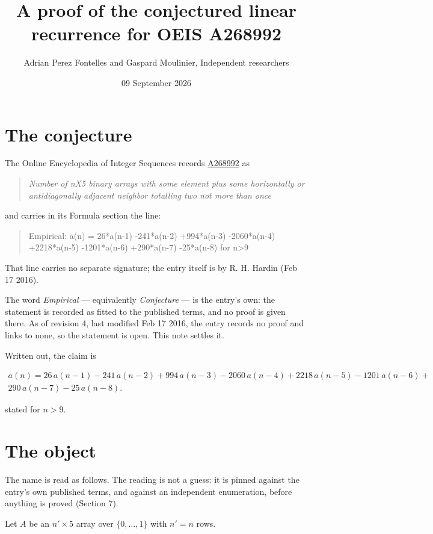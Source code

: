 \documentclass[11pt]{article}
\title{A proof of the conjectured linear recurrence for OEIS A268992}
\author{Adrian Perez Fontelles and Gaspard Moulinier, Independent researchers}
\date{09 September 2026}
\theoremstyle{definition}
\begin{document}
\maketitle
\section{The conjecture}

The Online Encyclopedia of Integer Sequences records \href{https://oeis.org/A268992}{A268992} as

\begin{quote}\itshape Number of nX5 binary arrays with some element plus some horizontally or antidiagonally adjacent neighbor totalling two not more than once\end{quote}

and carries in its Formula section the line:

\begin{quote}\ttfamily Empirical: a(n) = 26*a(n-1) -241*a(n-2) +994*a(n-3) -2060*a(n-4) +2218*a(n-5) -1201*a(n-6) +290*a(n-7) -25*a(n-8) for n>9\end{quote}

That line carries no separate signature; the entry itself is by R. H. Hardin (Feb 17 2016).

The word {\itshape Empirical} --- equivalently {\itshape Conjecture} --- is the entry's own: the statement is recorded as fitted to the published terms, and no proof is given there. As of revision 4, last modified Feb 17 2016, the entry records no proof and links to none, so the statement is open. This note settles it.

Written out, the claim is

\begin{multline*} a(n) = 26\,a(n-1) - 241\,a(n-2) + 994\,a(n-3) - 2060\,a(n-4) + 2218\,a(n-5) - 1201\,a(n-6) + \\ 290\,a(n-7) - 25\,a(n-8). \end{multline*}

stated for $n > 9$.

\section{The object}

The name is read as follows. The reading is not a guess: it is pinned against the entry's own published terms, and against an independent enumeration, before anything is proved (Section 7).

Let $A$ be an $n' \times 5$ array over $\{0,\dots,1\}$ with $n' = n$ rows.
\end{document}
